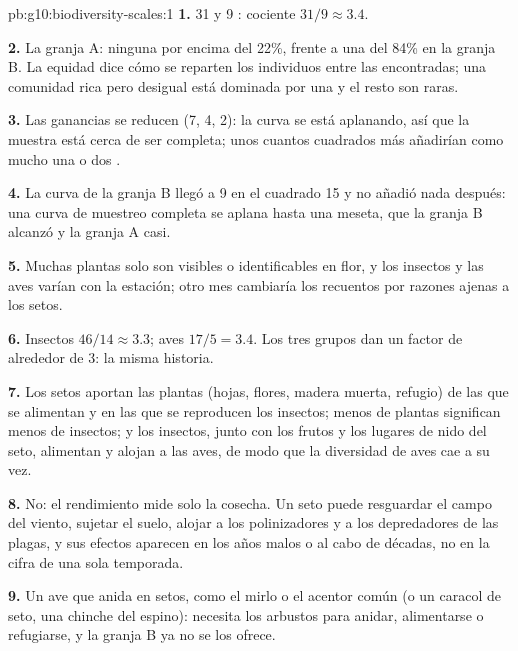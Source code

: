 \begin{solution}{pb:g10:biodiversity-scales:1}
\textbf{1.} 31 y 9 : cociente $31/9 \approx 3.4$.

\textbf{2.} La granja A: ninguna  por encima del 22\%, frente a
una del 84\% en la granja B. La equidad dice cómo se reparten los
individuos entre las  encontradas; una comunidad rica pero
desigual está dominada por una  y el resto son raras.

\textbf{3.} Las ganancias se reducen (7, 4, 2): la curva se está
aplanando, así que la muestra está cerca de ser completa; unos cuantos
cuadrados más añadirían como mucho una o dos .

\textbf{4.} La curva de la granja B llegó a 9 en el cuadrado 15 y no
añadió nada después: una curva de muestreo completa se aplana hasta una
meseta, que la granja B alcanzó y la granja A casi.

\textbf{5.} Muchas plantas solo son visibles o identificables en flor,
y los insectos y las aves varían con la estación; otro mes cambiaría
los recuentos por razones ajenas a los setos.

\textbf{6.} Insectos $46/14 \approx 3.3$; aves $17/5 = 3.4$. Los tres
grupos dan un factor de alrededor de 3: la misma historia.

\textbf{7.} Los setos aportan las plantas (hojas, flores, madera
muerta, refugio) de las que se alimentan y en las que se reproducen los
insectos; menos  de plantas significan menos  de
insectos; y los insectos, junto con los frutos y los lugares de nido
del seto, alimentan y alojan a las aves, de modo que la diversidad de
aves cae a su vez.

\textbf{8.} No: el rendimiento mide solo la cosecha. Un seto puede
resguardar el campo del viento, sujetar el suelo, alojar a los
polinizadores y a los depredadores de las plagas, y sus efectos
aparecen en los años malos o al cabo de décadas, no en la cifra de una
sola temporada.

\textbf{9.} Un ave que anida en setos, como el mirlo o el acentor común
(o un caracol de seto, una chinche del espino): necesita los arbustos
para anidar, alimentarse o refugiarse, y la granja B ya no se los
ofrece.


\end{solution}
